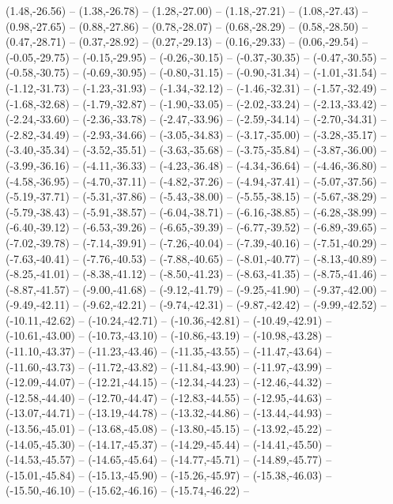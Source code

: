{  (1.48,-26.56) -- (1.38,-26.78) -- (1.28,-27.00) -- (1.18,-27.21) -- (1.08,-27.43) -- (0.98,-27.65) -- (0.88,-27.86) --
  (0.78,-28.07) -- (0.68,-28.29) -- (0.58,-28.50) -- (0.47,-28.71) -- (0.37,-28.92) -- (0.27,-29.13) -- (0.16,-29.33) --
  (0.06,-29.54) -- (-0.05,-29.75) -- (-0.15,-29.95) -- (-0.26,-30.15) -- (-0.37,-30.35) -- (-0.47,-30.55) -- (-0.58,-30.75) --
  (-0.69,-30.95) -- (-0.80,-31.15) -- (-0.90,-31.34) -- (-1.01,-31.54) -- (-1.12,-31.73) -- (-1.23,-31.93) -- (-1.34,-32.12) --
  (-1.46,-32.31) -- (-1.57,-32.49) -- (-1.68,-32.68) -- (-1.79,-32.87) -- (-1.90,-33.05) -- (-2.02,-33.24) -- (-2.13,-33.42) --
  (-2.24,-33.60) -- (-2.36,-33.78) -- (-2.47,-33.96) -- (-2.59,-34.14) -- (-2.70,-34.31) -- (-2.82,-34.49) -- (-2.93,-34.66) --
  (-3.05,-34.83) -- (-3.17,-35.00) -- (-3.28,-35.17) -- (-3.40,-35.34) -- (-3.52,-35.51) -- (-3.63,-35.68) -- (-3.75,-35.84) --
  (-3.87,-36.00) -- (-3.99,-36.16) -- (-4.11,-36.33) -- (-4.23,-36.48) -- (-4.34,-36.64) -- (-4.46,-36.80) -- (-4.58,-36.95) --
  (-4.70,-37.11) -- (-4.82,-37.26) -- (-4.94,-37.41) -- (-5.07,-37.56) -- (-5.19,-37.71) -- (-5.31,-37.86) -- (-5.43,-38.00) --
  (-5.55,-38.15) -- (-5.67,-38.29) -- (-5.79,-38.43) -- (-5.91,-38.57) -- (-6.04,-38.71) -- (-6.16,-38.85) -- (-6.28,-38.99) --
  (-6.40,-39.12) -- (-6.53,-39.26) -- (-6.65,-39.39) -- (-6.77,-39.52) -- (-6.89,-39.65) -- (-7.02,-39.78) -- (-7.14,-39.91) --
  (-7.26,-40.04) -- (-7.39,-40.16) -- (-7.51,-40.29) -- (-7.63,-40.41) -- (-7.76,-40.53) -- (-7.88,-40.65) -- (-8.01,-40.77) --
  (-8.13,-40.89) -- (-8.25,-41.01) -- (-8.38,-41.12) -- (-8.50,-41.23) -- (-8.63,-41.35) -- (-8.75,-41.46) -- (-8.87,-41.57) --
  (-9.00,-41.68) -- (-9.12,-41.79) -- (-9.25,-41.90) -- (-9.37,-42.00) -- (-9.49,-42.11) -- (-9.62,-42.21) -- (-9.74,-42.31) --
  (-9.87,-42.42) -- (-9.99,-42.52) -- (-10.11,-42.62) -- (-10.24,-42.71) -- (-10.36,-42.81) -- (-10.49,-42.91) -- (-10.61,-43.00) --
  (-10.73,-43.10) -- (-10.86,-43.19) -- (-10.98,-43.28) -- (-11.10,-43.37) -- (-11.23,-43.46) -- (-11.35,-43.55) -- (-11.47,-43.64) --
  (-11.60,-43.73) -- (-11.72,-43.82) -- (-11.84,-43.90) -- (-11.97,-43.99) -- (-12.09,-44.07) -- (-12.21,-44.15) -- (-12.34,-44.23) --
  (-12.46,-44.32) -- (-12.58,-44.40) -- (-12.70,-44.47) -- (-12.83,-44.55) -- (-12.95,-44.63) -- (-13.07,-44.71) -- (-13.19,-44.78) --
  (-13.32,-44.86) -- (-13.44,-44.93) -- (-13.56,-45.01) -- (-13.68,-45.08) -- (-13.80,-45.15) -- (-13.92,-45.22) -- (-14.05,-45.30) --
  (-14.17,-45.37) -- (-14.29,-45.44) -- (-14.41,-45.50) -- (-14.53,-45.57) -- (-14.65,-45.64) -- (-14.77,-45.71) -- (-14.89,-45.77) --
  (-15.01,-45.84) -- (-15.13,-45.90) -- (-15.26,-45.97) -- (-15.38,-46.03) -- (-15.50,-46.10) -- (-15.62,-46.16) -- (-15.74,-46.22) --
}
